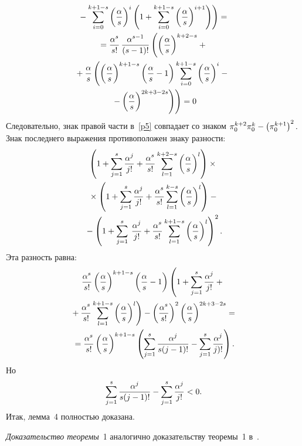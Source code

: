 \begin{multicols}{2}
{\begin{multline*}
\left.{}-
\sum\limits_{i=0}^{k+1-s}
\left(\fr{\alpha}{s}\right)^i\left(1+\sum\limits_{i=0}^{k+1-s}
\left(\fr{\alpha}{s}\right)^{i+1}\right)\right)={}
\\
{}=\fr{\alpha^s}{s!}\,\fr{\alpha^{s-1}}{(s-1)!}\left(\left(
\fr{\alpha}{s}\right)^{k+2-s}+{}\right.\\
{}+\fr{\alpha}{s}
\left(\left(\fr{\alpha}{s}\right)^{k+1-s}\left(\fr{\alpha}{s}-1\right)
\sum\limits_{i=0}^{k+1-s}
\left(\fr{\alpha}{s}\right)^i-{}\right.{}\\
\left.\left.{}-\left(\fr{\alpha}{s}\right)^{2k+3-2s}\right)\right)=0
\end{multline*}
Следовательно, знак правой части в~\eqref{p5} совпадает со знаком
$\pi_0^{k+2}\pi_0^{k}\hm-\left(\pi_0^{k+1}\right)^2.$ Знак последнего
выражения противоположен знаку разности:
\begin{multline*}
\left(1+\sum\limits_{j=1}^s \fr{\alpha^j}{j!}+
\fr{\alpha^s}{s!} \sum\limits_{l=1}^{k+2-s}\left(\fr{\alpha}{s}\right)^{l}\right)\times{}\\
{}\times
\left(1+\sum\limits_{j=1}^s \fr{\alpha^j}{j!}+
\fr{\alpha^s}{s!} \sum\limits_{l=1}^{k-s}\left(\fr{\alpha}{s}\right)^{l}\right)-{}
\\
{}-\left(1+\sum\limits_{j=1}^s\:\fr{\alpha^j}{j!}+
\fr{\alpha^s}{s!}\sum\limits_{l=1}^{k+1-s}\left(\fr{\alpha}{s}\right)^{l}\right)^2.
\end{multline*}
Эта разность равна:
\begin{multline*}
\fr{\alpha^s}{s!} \left(\fr{\alpha}{s}\right)^{k+1-s}\left(\fr{\alpha}{s}-1\right)
\left(
\vphantom{\sum\limits_{l=1}^{k+1-s}}
1+\sum\limits_{j=1}^s \fr{\alpha^j}{j!}+{}\right.\\
\left.{}+
\fr{\alpha^s}{s!} \sum\limits_{l=1}^{k+1-s}\left(\fr{\alpha}{s}\right)^{l}\right)-
\left(\fr{\alpha^s}{s!}\right)^2\left(\fr{\alpha}{s}\right)^{2k+3-2s}={}
\\
{}=\fr{\alpha^s}{s!}\left(\fr{\alpha}{s}\right)^{k+1-s}
\left(\sum\limits_{j=1}^s\fr{\alpha^j}{s(j-1)!}-
\sum\limits_{j=1}^s\fr{\alpha^j}{j)!}\right).
\end{multline*}
Но
$$
\sum\limits_{j=1}^s\fr{\alpha^j}{s(j-1)!}- \sum\limits_{j=1}^s\fr{\alpha^j}{j!}<0.
$$
Итак, лемма~4 полностью доказана.

\textit{Доказательство теоремы}~1 аналогично доказательству
теоремы~1 в~\cite{7-aga}.

}



\end{multicols}
